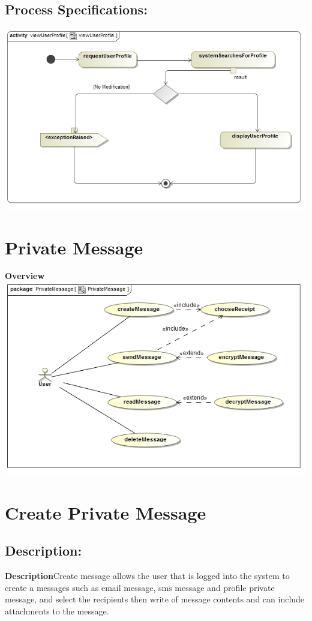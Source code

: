 \documentclass[a4paper,11pt]{article}
\begin{document}
\subsection{Process Specifications:} 
\includegraphics[width=1\linewidth]{./Images/UserProfile/ViewUserProfileActivity}

\section{Private Message}
\textbf{Overview}\\
\includegraphics[width=1\linewidth]{./Images/OverviewDiagrams/PrivateMessage.jpg}\\
\section{Create Private Message}
\subsection*{Description:}
\textbf{Description}Create message allows the user that is logged into the system to create a messages such as email message, sms message and profile private message, and select the recipients then write of message contents and can include attachments to the message. 
\end{document}
